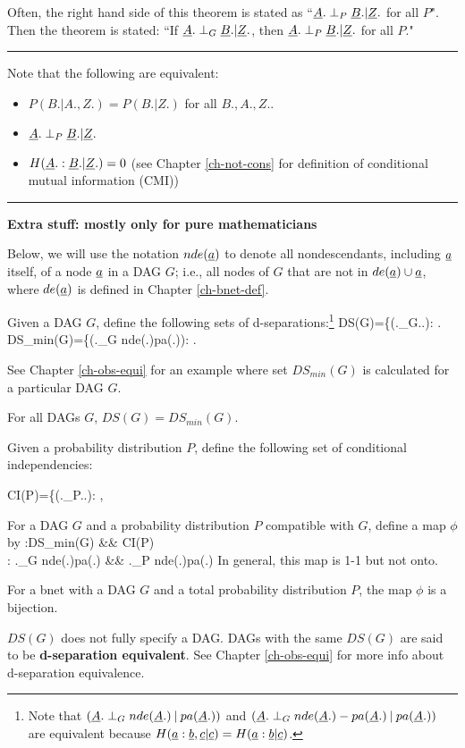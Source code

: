 Often, the right hand side
of this theorem is stated as 
``${\underline{A}}.\perp_P {\underline{B}}.|{\underline{Z}}.$
for all $P$".
Then the theorem is stated:
``If 
${\underline{A}}.\perp_G {\underline{B}}.|{\underline{Z}}.$, then
${\underline{A}}.\perp_P {\underline{B}}.|{\underline{Z}}.$ for all $P$."  

\hrule
Note that 
the following are equivalent:
\begin{itemize}
\item
$P(B.|A., Z.)=P(B.|Z.)$ for all $B., A., Z.$.
\item
${\underline{A}}.\perp_P {\underline{B}}.|{\underline{Z}}.$
\item
$H({\underline{A}}.:{\underline{B}}.|{\underline{Z}}.)=0$
(see Chapter \ref{ch-not-cons}
for definition of
 conditional mutual information (CMI))
\end{itemize}
\hrule\noindent
{\bf Extra stuff: mostly only for 
 pure mathematicians}

Below, we will use
the notation $nde({\underline{a}})$
to denote
all nondescendants,
including ${\underline{a}}$ itself, 
of a node ${\underline{a}}$
in a DAG $G$; i.e.,
all nodes of $G$ that are not
in $de({\underline{a}})\cup {\underline{a}}$, where
$de({\underline{a}})$
is defined in Chapter \ref{ch-bnet-def}.

Given a DAG $G$, define 
the following
sets of d-separations:\footnote{
Note that
$({\underline{A}}.\perp_G
nde({\underline{A}}.){\:\mathbf{|}\:} pa({\underline{A}}.))$ and
$({\underline{A}}.\perp_G
nde({\underline{A}}.)-pa({\underline{A}}.){\:\mathbf{|}\:} pa({\underline{A}}.))$
are
equivalent
because
$H({\underline{a}}:{\underline{b}}, {\underline{c}}|{\underline{c}})=
H({\underline{a}}:{\underline{b}}|{\underline{c}})$.
}
\beq
DS(G)=\{(\rvA.\perp_G\rvB.\cond\rvZ.):
\;.
\eeq
\beq
DS_{min}(G)=\{(\rvA.\perp_G
nde(\rvA.)\cond pa(\rvA.)):
\;.
\eeq

See Chapter \ref{ch-obs-equi}
for an example
where set $DS_{min}(G)$
is calculated for 
a particular DAG $G$.

\begin{claim}
For all DAGs $G$, $DS(G)=DS_{min}(G)$.
\end{claim}

Given a probability distribution  $P$, 
define the following
set of conditional independencies:

\beq
CI(P)=\{(\rvA.\perp_P\rvB.\cond \rvZ.):
\;,
\eeq


For a DAG $G$
and a probability
distribution $P$
compatible with $G$,
define  a map $\phi$
by
\beqa
\phi:DS_{min}(G) &\rarrow& CI(P)
\\
\phi: \rvA.\perp_G nde(\rvA.)\cond pa(\rvA.)
&\mapsto&
\rvA.\perp_P nde(\rvA.)\cond pa(\rvA.)
\eeqa
In general, this map
is 1-1 but not onto.


\begin{claim}
For a bnet 
with a DAG $G$
and a total probability distribution $P$,
the map $\phi$ is a bijection.
\end{claim}

$DS(G)$
does not fully specify a DAG.
DAGs with the same 
$DS(G)$ are said to be
{\bf d-separation equivalent}.
See Chapter \ref{ch-obs-equi}
for more info about 
d-separation equivalence.